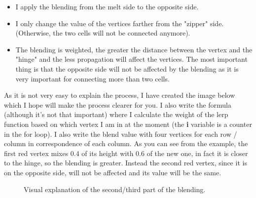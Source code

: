 	\begin{itemize}
		
		\item I apply the blending from the melt side to the opposite side.
		\item I only change the value of the vertices farther from the "zipper" side. (Otherwise, the two cells will not be connected anymore).
		\item The blending is weighted, the greater the distance between the vertex and the "hinge" and the less propagation will affect the vertices. The most important thing is that the opposite side will not be affected by the blending as it is very important for connecting more than two cells.
			
	\end{itemize}

\noindent
As it is not very easy to explain the process, I have created the image below which I hope will make the process clearer for you. I also write the formula (although it's not that important) where I calculate the weight of the lerp function based on which vertex I am in at the moment (the \textbf{i} variable is a counter in the for loop). I also write the blend value with four vertices for each row / column in correspondence of each column. As you can see from the example, the first red vertex mixes 0.4 of its height with 0.6 of the new one, in fact it is closer to the hinge, so the blending is greater. Instead the second red vertex, since it is on the opposite side, will not be affected and its value will be the same.

\begin{figure}[hbt!]
	\centering
	\vspace*{\fill}

	\noindent{}%

	\caption{Visual explanation of the second/third part of the blending.}
\end{figure} 


